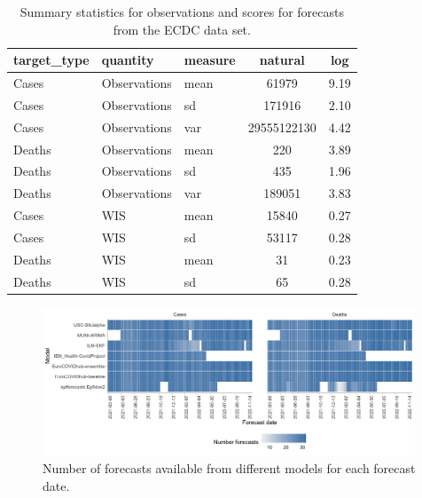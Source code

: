 \documentclass{article}
\begin{document}
\begin{table}[h!]
    \centering
\begin{tabular}{lllcc}
\toprule
target\_type & quantity & measure & natural & log\\
\midrule
Cases & Observations & mean & 61979 & 9.19\\
Cases & Observations & sd & 171916 & 2.10\\
Cases & Observations & var & 29555122130 & 4.42\\
Deaths & Observations & mean & 220 & 3.89\\
Deaths & Observations & sd & 435 & 1.96\\
\addlinespace
Deaths & Observations & var & 189051 & 3.83\\
Cases & WIS & mean & 15840 & 0.27\\
Cases & WIS & sd & 53117 & 0.28\\
Deaths & WIS & mean & 31 & 0.23\\
Deaths & WIS & sd & 65 & 0.28\\
\bottomrule
\end{tabular}
    \caption{Summary statistics for observations and scores for forecasts from the ECDC data set.}
    \label{tab:HUB-summary}
\end{table}

\begin{figure}[h!]
    \centering
    \includegraphics[width=0.99\textwidth]{output/figures/number-avail-forecasts.png}
    \caption{
    Number of forecasts available from different models for each forecast date. 
    }
    \label{fig:HUB-num-avail-models}
\end{figure}
\end{document}
